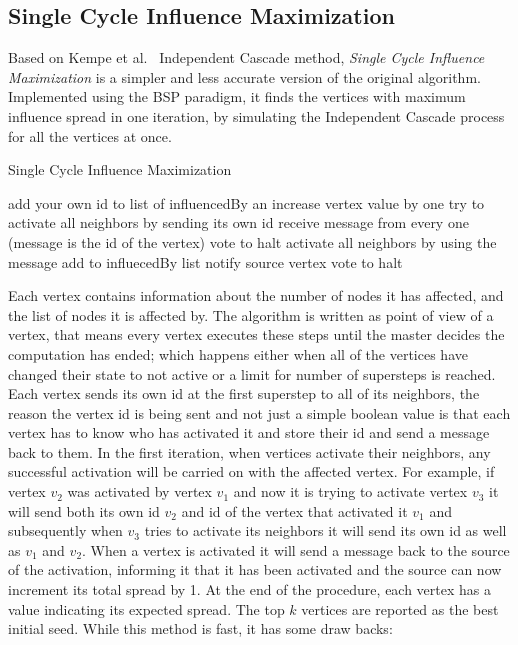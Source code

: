 \documentclass[english]{tktltiki}
\begin{document}
\subsection{Single Cycle Influence Maximization}
Based on Kempe et al.\ \cite{kempe03} Independent Cascade method, \textit{Single Cycle Influence Maximization} is a simpler and less accurate version of the original algorithm. Implemented using the BSP paradigm, it finds the vertices with maximum influence spread in one iteration, by simulating the Independent Cascade process for all the vertices at once.
\begin{algorithm}[ht!]
\caption{Single Cycle Influence Maximization}
\label{alg:singleccycleIM}
\begin{algorithmic}
	\State add your own id to list of influencedBy an increase vertex value by one
	\State try to activate all neighbors by sending its own id
\Else
	\State receive message from every one (message is the id of the vertex)
			\State vote to halt
		\Else
			\State activate all neighbors by using the message
			\State add to influecedBy list
			\State notify source vertex
			\State vote to halt
		\EndIf	
	\EndFor
\EndIf
\end{algorithmic}
\end{algorithm}
Each vertex contains information about the number of nodes it has affected, and the list of nodes it is affected by. The algorithm is written as point of view of a vertex, that means every vertex executes these steps until the master decides the computation has ended; which happens either when all of the vertices have changed their state to not active or a limit for number of supersteps is reached. Each vertex sends its own id at the first superstep to all of its neighbors, the reason the vertex id is being sent and not just a simple boolean value is that each vertex has to know who has activated it and store their id and send a message back to them. In the first iteration, when vertices activate their neighbors, any successful activation will be carried on with the affected vertex. For example, if vertex $v_2$ was activated by vertex $v_1$ and now it is trying to activate vertex $v_3$ it will send both its own id $v_2$ and id of the vertex that activated it $v_1$ and subsequently when $v_3$ tries to activate its neighbors it will send its own id as well as $v_1$ and $v_2$. When a vertex is activated it will send a message back to the source of the activation, informing it that it has been activated and the source can now increment its total spread by 1. At the end of the procedure, each vertex has a value indicating its expected spread. The top $k$ vertices are reported as the best initial seed. While this method is fast, it has some draw backs:
\end{document}
